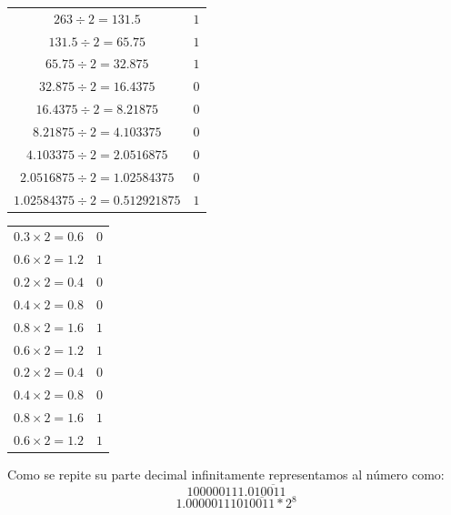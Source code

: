 \documentclass[12pt]{article}
\begin{document}
\begin{center}
    \begin{tabular}{|c|c|}
        \hline
        $263 \div 2 = 131.5$ & $1$\\
        $131.5 \div 2 = 65.75$ & $1$\\
        $65.75 \div 2 = 32.875$ & $1$\\
        $32.875 \div 2 = 16.4375$ & $0$\\
        $16.4375 \div 2 = 8.21875$ & $0$\\
        $8.21875 \div 2 = 4.103375$ & $0$\\
        $4.103375 \div 2 = 2.0516875$ & $0$\\
        $2.0516875 \div 2 = 1.02584375$ & $0$\\
        $1.02584375 \div 2 = 0.512921875$ & $1$\\
        \hline
      \end{tabular} 
\end{center}
\begin{center}
    \begin{tabular}{|c|c|}
        \hline
        $0.3 \times 2 = 0.6$ & $0$\\
        $0.6 \times 2 = 1.2$ & $1$\\
        $0.2 \times 2 = 0.4$ & $0$\\
        $0.4 \times 2 = 0.8$ & $0$\\
        $0.8 \times 2 = 1.6$ & $1$\\
        $0.6 \times 2 = 1.2$ & $1$\\
        $0.2 \times 2 = 0.4$ & $0$\\
        $0.4 \times 2 = 0.8$ & $0$\\
        $0.8 \times 2 = 1.6$ & $1$\\
        $0.6 \times 2 = 1.2$ & $1$\\
        \hline
      \end{tabular} 
\end{center}
Como se repite su parte decimal infinitamente representamos al número como:
$$ 100000111.01\overline{0011}$$
$$ 1.0000011101\overline{0011}*2^8$$
\end{document}
